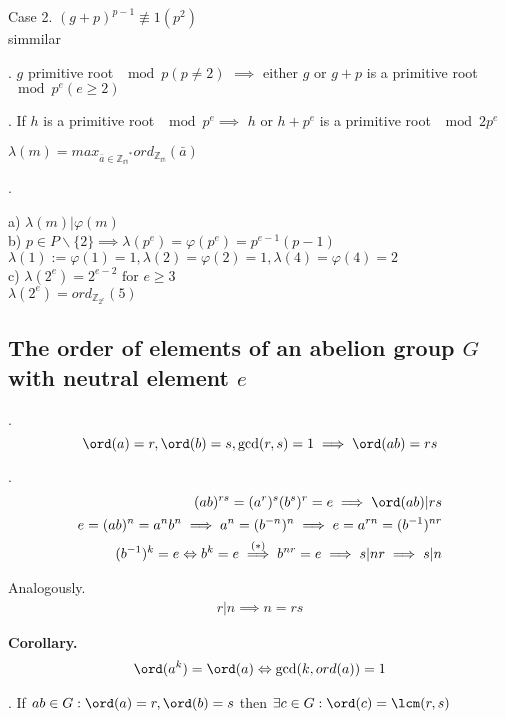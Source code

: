 Case 2. $(g+p)^{p-1} \not\equiv 1 (p^2)$\\
simmilar

\Lemma.
$g$ primitive root $\mod p (p \neq 2)$ $\implies$ either $g$ or $g+p$ is a primitive root $\mod p^e(e \geq 2)$

\Lemma.
If $h$ is a primitive root $\mod p^e \implies$ $h$ or $h+p^e$ is a primitive root $\mod 2p^e$

\begin{definition}
  $\lambda(m) = max_{\bar{a} \in \mathbb{Z_m}^{*}} ord_{\mathbb{Z_m}}(\bar{a})$
\end{definition}

\Remark.

a) $\lambda(m) | \varphi(m)$ \\
b) $p \in P \backslash\{2\} \implies \lambda(p^e) = \varphi(p^e) = p^{e-1}(p-1)$ \\
  $\lambda(1) := \varphi(1) = 1, \lambda(2) = \varphi(2) = 1, \lambda(4) = \varphi(4) = 2$\\
  c) $\lambda(2^e) = 2^{e-2} \text{ for } e \geq 3$ \\
  $\lambda(2^e) = ord_{\mathbb{Z}_{2^e}}(5)$

\subsection{The order of elements of an abelion group $G$ with neutral element $e$}
\Theorem.
\[
  \ord(a) = r, \ord(b) = s, \gcd(r,s) = 1 \implies \ord(ab) = rs
\]

\Proof.
\begin{align*}
  (ab)^{rs} = (a^r)^s (b^s)^r = e \implies \ord(ab) |rs \\
  e = (ab)^n = a^n b^n \implies a^n = (b^{-n})^n \implies e = a^{rn} = (b^{-1})^{nr} \\
  (b^{-1})^k = e \Leftrightarrow b^k = e \stackrel{(*)}{\implies} b^{nr} = e \implies s|nr \implies s|n \\
\end{align*}

Analogously.
\begin{align*}
  r|n \implies n = rs
\end{align*}

\textbf{Corollary.}
\begin{align*}
  \ord(a^k) = \ord(a) \Leftrightarrow \gcd(k, ord(a)) = 1
\end{align*}

\Theorem.
If $ab \in G: \ord(a)=r, \ord(b) = s$ then $\exists c \in G: \ord(c) = \lcm(r,s)$

